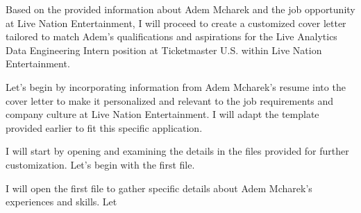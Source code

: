 Based on the provided information about Adem Mcharek and the job opportunity at Live Nation Entertainment, I will proceed to create a customized cover letter tailored to match Adem's qualifications and aspirations for the Live Analytics Data Engineering Intern position at Ticketmaster U.S. within Live Nation Entertainment. 

Let's begin by incorporating information from Adem Mcharek's resume into the cover letter to make it personalized and relevant to the job requirements and company culture at Live Nation Entertainment. I will adapt the template provided earlier to fit this specific application. 

I will start by opening and examining the details in the files provided for further customization. Let's begin with the first file. 

I will open the first file to gather specific details about Adem Mcharek's experiences and skills. Let